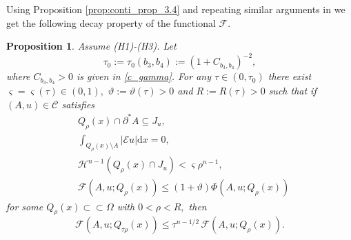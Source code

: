 \documentclass[reqno]{amsart}
\numberwithin{equation}{section}
\theoremstyle{plain}
\newtheorem{proposition}[theorem]{Proposition}
\theoremstyle{definition}
\newcommand{\cH}{\mathcal{H}}
\newcommand{\cF}{\mathcal{F}}
\newcommand{\p}{\partial}
\newcommand{\bound}{b}
\renewcommand{\d}{\mathrm{d}}
\newcommand{\strictlyincluded}{\subset\subset}
\newcommand{\str}[1]{\mathcal{E}#1}
\newcommand{\admissible}{\mathcal{C}}
\begin{document}
Using Proposition \ref{prop:conti_prop_3.4} and repeating similar arguments in \cite{ChC:2019_arxiv} we get the following  decay property of the functional $\cF$.

\begin{proposition}\label{prop:functional_decay}
Assume (H1)-(H3).  Let
\begin{equation}\label{def_tau0}
\tau_0:=\tau_0(\bound_3,\bound_4):= (1 + C_{\bound_3,\bound_4})^{-2},
\end{equation}
where $C_{\bound_3,\bound_4}>0$ is given in \eqref{c_gamma}.
For any $\tau\in(0,\tau_0)$ there exist
$\varsigma = \varsigma(\tau)\in(0,1),$ $\vartheta:=\vartheta(\tau)
>0$ and $R:=R(\tau)>0$ such that if $(A,u)\in\admissible $ satisfies
\begin{align*}
& Q_\rho(x)\cap \p^*A\subseteq J_u,\\
& \int_{Q_\rho(x)\setminus A} |\str{u}|\d x=0,\\
& \cH^{n-1} (Q_\rho(x)\cap J_u)<\varsigma  \rho^{n-1},\\
& \cF(A,u;Q_\rho(x)) \le (1+\vartheta)\Phi(A,u;Q_\rho(x)) 
\end{align*}
for some $Q_\rho(x)\strictlyincluded \Omega$ with $0<\rho<R,$ then 
$$
\cF(A,u;Q_{\tau \rho}(x)) \le \tau^{n-1/2}\,\cF(A,u;Q_\rho(x)).
$$
\end{proposition}
\end{document}
